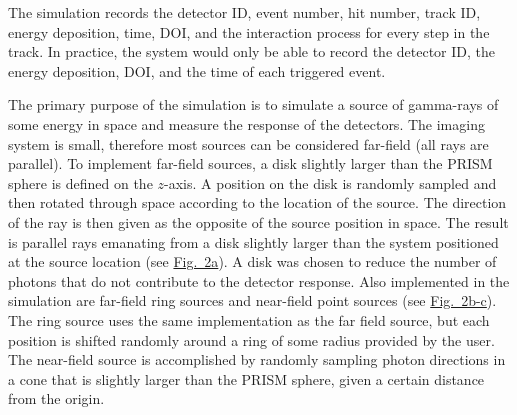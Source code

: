 \documentclass[10pt]{article}
\begin{document}
%

The simulation records the detector ID, event number, hit number, track ID, energy deposition, time, DOI, and the interaction process for every step in the track. In practice, the system would only be able to record the detector ID, the energy deposition, DOI, and the time of each triggered event. 

The primary purpose of the simulation is to simulate a source of gamma-rays of some energy in space and measure the response of the detectors. The imaging system is small, therefore most sources can be considered far-field (all rays are parallel). To implement far-field sources, a disk slightly larger than the PRISM sphere is defined on the $z$-axis. A position on the disk is randomly sampled and then rotated through space according to the location of the source. The direction of the ray is then given as the opposite of the source position in space. The result is parallel rays emanating from a disk slightly larger than the system positioned at the source location (see \hyperlink{fig2}{Fig.~2a}). A disk was chosen to reduce the number of photons that do not contribute to the detector response. Also implemented in the simulation are far-field ring sources and near-field point sources (see \hyperlink{fig2}{Fig.~2b-c}). The ring source uses the same implementation as the far field source, but each position is shifted randomly around a ring of some radius provided by the user. The near-field source is accomplished by randomly sampling photon directions in a cone that is slightly larger than the PRISM sphere, given a certain distance from the origin.
\end{document}
